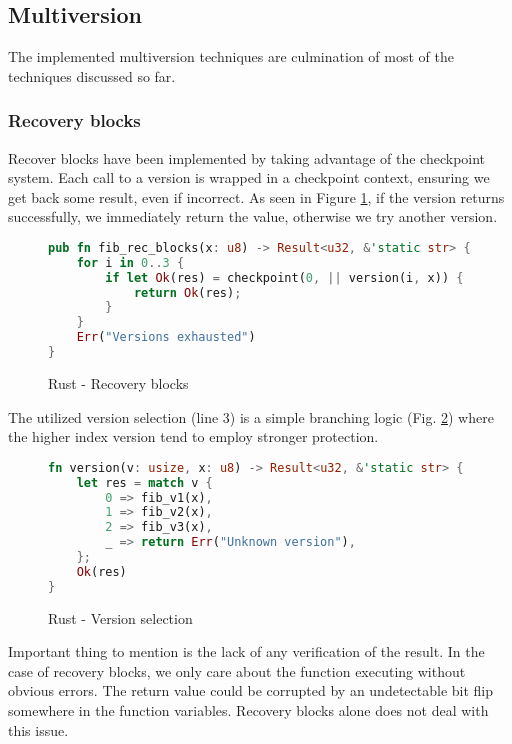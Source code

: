 \subsection{Multiversion}

The implemented multiversion techniques are culmination of most of the techniques discussed so far.

\subsubsection{Recovery blocks}

Recover blocks have been implemented by taking advantage of the checkpoint system. Each call to a version is wrapped in a checkpoint context, ensuring we get back some result, even if incorrect. As seen in Figure \ref{fig:recover_blocks}, if the version returns successfully, we immediately return the value, otherwise we try another version.

\begin{figure}[!h]
\begin{lstlisting}[language=Rust]
pub fn fib_rec_blocks(x: u8) -> Result<u32, &'static str> {
    for i in 0..3 {
        if let Ok(res) = checkpoint(0, || version(i, x)) {
            return Ok(res);
        }
    }
    Err("Versions exhausted")
}
\end{lstlisting}
\caption{Rust - Recovery blocks}
\label{fig:recover_blocks}
\end{figure}    

The utilized version selection (line 3) is a simple branching logic (Fig. \ref{fig:version_select}) where the higher index version tend to employ stronger protection.

\begin{figure}[!h]
\begin{lstlisting}[language=Rust]
fn version(v: usize, x: u8) -> Result<u32, &'static str> {
    let res = match v {
        0 => fib_v1(x),
        1 => fib_v2(x),
        2 => fib_v3(x),
        _ => return Err("Unknown version"),
    };
    Ok(res)
}
\end{lstlisting}
\caption{Rust - Version selection}
\label{fig:version_select}
\end{figure}

Important thing to mention is the lack of any verification of the result. In the case of recovery blocks, we only care about the function executing without obvious errors. The return value could be corrupted by an undetectable bit flip somewhere in the function variables. Recovery blocks alone does not deal with this issue.

